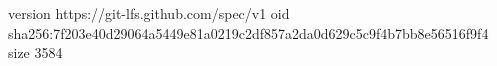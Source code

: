 version https://git-lfs.github.com/spec/v1
oid sha256:7f203e40d29064a5449e81a0219c2df857a2da0d629c5c9f4b7bb8e56516f9f4
size 3584
